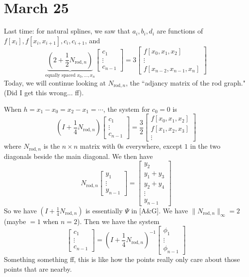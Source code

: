 \documentclass{article}
\theoremstyle{plain}
\theoremstyle{remark}
\begin{document}
\section{March 25}
Last time: for natural splines, we saw that
$a_i,b_i,d_i$ are functions of $f[x_i], f[x_i,x_{i+1}], c_i, c_{i+1}$,
and
\[
	\underbrace{\left(2 + \frac12 N_{\text{rod},n}\right)}
	_{\text{equally spaced }x_0,\dots,x_n}
	\begin{bmatrix} c_1 \\ \vdots \\ c_{n-1} \end{bmatrix}
	= 3 \begin{bmatrix} f[x_0,x_1,x_2] \\ \vdots \\ f[x_{n-2},x_{n-1},x_n]\end{bmatrix}
\]
Today, we will continue looking at $N_{\text{rod},n}$,
the ``adjancy matrix of the rod graph."
(Did I get this wrong... ff).

When $h = x_1 - x_0 = x_2 - x_1 = \cdots$, the system for $c_0 = 0$ is
\[
	\left(I + \frac14 N_{\text{rod},n}\right)
	\begin{bmatrix} c_1 \\ \vdots \\ c_{n-1} \end{bmatrix}
	= \frac32 \begin{bmatrix} f[x_0,x_1,x_2] \\ f[x_1,x_2,x_3] \\ \vdots\end{bmatrix}
\]
where $N_{\text{rod},n}$ is the $n \times n$ matrix with $0$s everywhere,
except $1$ in the two diagonals beside the main diagonal.
We then have
\[
	N_{\text{rod},n} \begin{bmatrix} y_1 \\ \vdots \\ y_{n-1} \end{bmatrix}
	= \begin{bmatrix} y_2 \\ y_1 + y_3 \\ y_2 + y_4 \\ \vdots\\ y_{n-1} \end{bmatrix}
\]
So we have $(I + \frac14 N_{\text{rod},n})$ is essentially
$\Psi$ in [A\&G].
We have $\lVert N_{\text{rod},n} \rVert_\infty = 2$
(maybe $=1$ when $n = 2$).
Then we have the system
\[
	\begin{bmatrix} c_1 \\ \vdots \\ c_{n-1} \end{bmatrix}
	= \left(I + \frac14 N_{\text{rod},n} \right)^{-1}
	\begin{bmatrix} \phi_1 \\ \vdots \\ \phi_{n-1} \end{bmatrix}
\]
Something something ff, this is like how the points
really only care about those points that are nearby.
\end{document}
